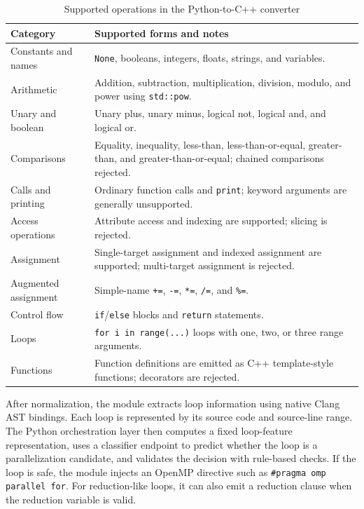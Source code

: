 \begin{table}[H]
\centering
\footnotesize
\setlength{\tabcolsep}{5pt}
\renewcommand{\arraystretch}{0.95}
\caption{Supported operations in the Python-to-C++ converter}
\begin{tabular}{p{}p{}}
\toprule
Category & Supported forms and notes \\
\midrule
Constants and names & \texttt{None}, booleans, integers, floats, strings, and variables. \\
Arithmetic & Addition, subtraction, multiplication, division, modulo, and power using \texttt{std::pow}. \\
Unary and boolean & Unary plus, unary minus, logical not, logical and, and logical or. \\
Comparisons & Equality, inequality, less-than, less-than-or-equal, greater-than, and greater-than-or-equal; chained comparisons rejected. \\
Calls and printing & Ordinary function calls and \texttt{print}; keyword arguments are generally unsupported. \\
Access operations & Attribute access and indexing are supported; slicing is rejected. \\
Assignment & Single-target assignment and indexed assignment are supported; multi-target assignment is rejected. \\
Augmented assignment & Simple-name \texttt{+=}, \texttt{-=}, \texttt{*=}, \texttt{/=}, and \texttt{\%=}. \\
Control flow & \texttt{if}/\texttt{else} blocks and \texttt{return} statements. \\
Loops & \texttt{for i in range(...)} loops with one, two, or three range arguments. \\
Functions & Function definitions are emitted as C++ template-style functions; decorators are rejected. \\
\bottomrule
\end{tabular}
\end{table}

After normalization, the module extracts loop information using native Clang AST
bindings. Each loop is represented by its source code and source-line range. The
Python orchestration layer then computes a fixed loop-feature representation,
uses a classifier endpoint to predict whether the loop is a parallelization
candidate, and validates the decision with rule-based checks. If the loop is
safe, the module injects an OpenMP directive such as
\texttt{\#pragma omp parallel for}. For reduction-like loops, it can also emit a
reduction clause when the reduction variable is valid.

